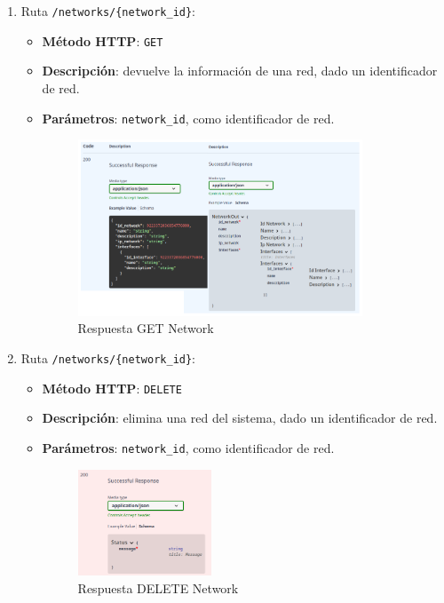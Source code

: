 \documentclass[a4paper, oneside, 12pt]{book}
\begin{document}
\begin{enumerate}
		\pagebreak
		
		\item Ruta \texttt{/networks/\{network\_id\}}:
		
		\begin{itemize}
			\item \textbf{Método HTTP}: \texttt{GET}
			\item \textbf{Descripción}: devuelve la información de una red, dado un identificador de red.
			\item \textbf{Parámetros}: \texttt{network\_id}, como identificador de red.
			
			\begin{figure}[h!]
				\begin{center}
					\includegraphics[width=0.85\textwidth]{diag/response_get_network.png}
					\caption{Respuesta GET Network}
					\label{img: response get network}
				\end{center}
			\end{figure}
		\end{itemize}
	
		\item Ruta \texttt{/networks/\{network\_id\}}:
		
		\begin{itemize}
			\item \textbf{Método HTTP}: \texttt{DELETE}
			\item \textbf{Descripción}: elimina una red del sistema, dado un identificador de red. 
			\item \textbf{Parámetros}: \texttt{network\_id}, como identificador de red.
			
			\begin{figure}[h!]
				\begin{center}
					\includegraphics[width=0.4\textwidth]{img/response_delete_network.png}
					\caption{Respuesta DELETE Network}
					\label{img: response delete network}
				\end{center}
			\end{figure}
		\end{itemize}
	

\end{enumerate}
\end{document}
